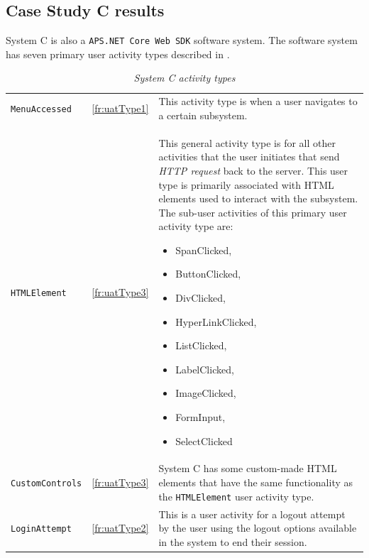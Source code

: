 \clearpage

\subsection{Case Study C results}\label{sec:ch3_csC}
System C is also a \texttt{APS.NET Core Web SDK} software system. The software system has seven primary user activity types described in .

\begin{table}[!htb]
	\centering
	\caption[System A activity types]{\textit{System C activity types}}
	\label{tbl:ch3_systemCActivityTypes}
	\begin{tabularx}{\textwidth}{llX}
		\toprule
		\thead{Activity} & \thead{Functional requirement} & \thead{Description} \\
		\midrule
		\rowcolor{lightgray}
		\texttt{MenuAccessed} & \ref{fr:uatType1} & \RaggedRight This activity type is when a user navigates to a certain subsystem. \\ 
		\texttt{HTMLElement} & \ref{fr:uatType3} & \RaggedRight This general activity type is for all other activities that the user initiates that send \textit{HTTP request} back to the server. This user type is primarily associated with HTML elements used to interact with the subsystem. The sub-user activities of this primary user activity type are: \begin{itemize}
			\item SpanClicked,
			\item ButtonClicked, 
			\item DivClicked, 
			\item HyperLinkClicked,
			\item ListClicked, 
			\item LabelClicked, 
			\item ImageClicked, 
			\item FormInput, 
			\item SelectClicked
		\end{itemize} \\
		\rowcolor{lightgray}
		\texttt{CustomControls} & \ref{fr:uatType3} & \RaggedRight System C has some custom-made HTML elements that have the same functionality as the \texttt{HTMLElement} user activity type. \\ 
		\texttt{LoginAttempt} & \ref{fr:uatType2} & \RaggedRight This is a user activity for a logout attempt by the user using the logout options available in the system to end their session. \\ 

\end{tabularx}
\end{table}
